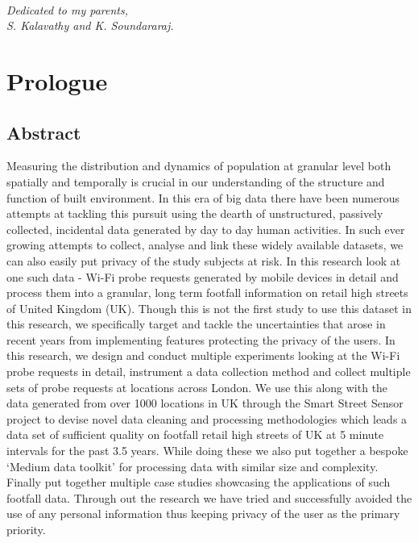 
\cleardoublepage
~\vfill
\begin{doublespace}
\noindent\fontsize{12}{12}\selectfont\itshape \nohyphenation
\noindent Dedicated to my parents,\\
\noindent S. Kalavathy and K. Soundararaj.
\end{doublespace}
\vfill
\vfill

\chapter*{Prologue}

\section*{Abstract} 

Measuring the distribution and dynamics of population at granular level both spatially and temporally is crucial in our understanding of the structure and function of built environment.
In this era of big data there have been numerous attempts at tackling this pursuit using the dearth of unstructured, passively collected, incidental data generated by day to day human activities.
In such ever growing attempts to collect, analyse and link these widely available datasets, we can also easily put privacy of the study subjects at risk.
In this research look at one such data - Wi-Fi probe requests generated by mobile devices in detail and process them into a granular, long term footfall information on retail high streets of United Kingdom (UK).
Though this is not the first study to use this dataset in this research, we specifically target and tackle the uncertainties that arose in recent years from implementing features protecting the privacy of the users. In this research, we design and conduct multiple experiments looking at the Wi-Fi probe requests in detail, instrument a data collection method and collect multiple sets of probe requests at locations across London. We use this along with the data generated from over 1000 locations in UK through the Smart Street Sensor project to devise novel data cleaning and processing methodologies which leads a data set of sufficient quality on footfall retail high streets of UK at 5 minute intervals for the past 3.5 years. While doing these we also put together a bespoke `Medium data toolkit' for processing data with similar size and complexity. Finally put together multiple case studies showcasing the applications of such footfall data. Through out the research we have tried and successfully avoided the use of any personal information thus keeping privacy of the user as the primary priority.

